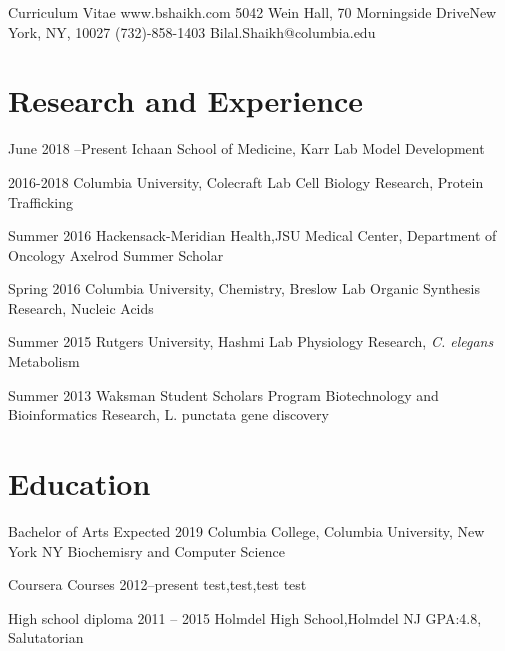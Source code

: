 \documentclass{bscv}
\begin{document}
  {Curriculum Vitae} {www.bshaikh.com} {5042 Wein Hall, 70 Morningside Drive\newline New York, NY, 10027} {(732)-858-1403} {Bilal.Shaikh@columbia.edu}


\section{Research and Experience}

\begin{eventlist}
 
\item{June 2018 --Present} 
  {Ichaan School of Medicine, Karr Lab}
  {Model Development}

\item{2016-2018}
  {Columbia University, Colecraft Lab}
  {Cell Biology Research, Protein Trafficking}

\item{Summer 2016}
  {Hackensack-Meridian Health,\newline JSU Medical Center, Department of Oncology}
  {Axelrod Summer Scholar}
  
\item{Spring 2016}
  {Columbia University, Chemistry, Breslow Lab}
  {Organic Synthesis Research, Nucleic Acids}

\item{Summer 2015}
  {Rutgers University, Hashmi Lab}
  { Physiology Research, \textit{C. elegans} Metabolism}
  
\item{Summer 2013}
  {Waksman Student Scholars Program}
  {Biotechnology and Bioinformatics Research, L. punctata gene discovery}
\end{eventlist}

\section{Education}

\begin{yearlist}

\item[Bachelor of Arts]{Expected  2019}
  {Columbia College, \newline Columbia University, \newline New York NY} {Biochemisry and \newline Computer Science}

\item[Coursera Courses]{2012--present}
  {test,test,test}
  {test}
  

\item[High school diploma]{2011 -- 2015}
  {Holmdel High School,\newline Holmdel NJ}
  {GPA:4.8, Salutatorian}
  
\end{yearlist}
\end{document}
